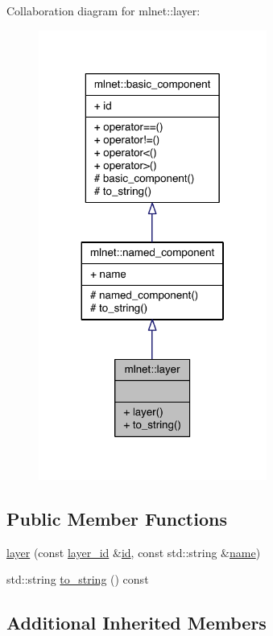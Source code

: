 Collaboration diagram for mlnet\+:\+:layer\+:\nopagebreak
\begin{figure}[H]
\begin{center}
\leavevmode
\includegraphics[width=212pt]{classmlnet_1_1layer__coll__graph}
\end{center}
\end{figure}
\subsection*{Public Member Functions}
\begin{DoxyCompactItemize}
\item 
\hyperlink{classmlnet_1_1layer_a4b3b77912bdb71f481028174e22f5a25}{layer} (const \hyperlink{namespacemlnet_a84ad9c6056f0eb7d129995351f9b13fb}{layer\+\_\+id} \&\hyperlink{classmlnet_1_1basic__component_a7d56ea959ef686405bc0fa4830b03347}{id}, const std\+::string \&\hyperlink{classmlnet_1_1named__component_a3015f6650729352abae8fb01e7ee7ca7}{name})
\item 
std\+::string \hyperlink{classmlnet_1_1layer_a3a7efb6528fc88b0e093957c66830bd5}{to\+\_\+string} () const 
\end{DoxyCompactItemize}
\subsection*{Additional Inherited Members}


